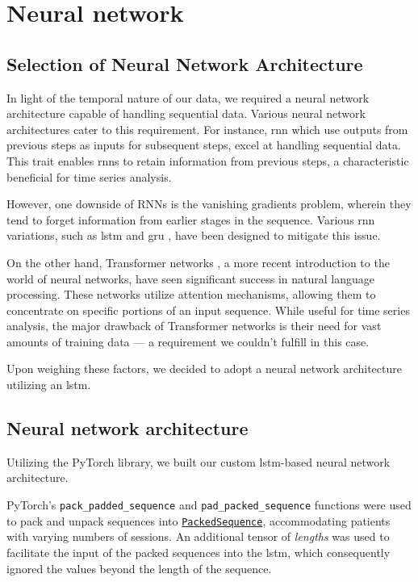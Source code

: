 \chapter{Neural network}\label{chap:nn}


\section{Selection of Neural Network Architecture}

In light of the temporal nature of our data, we required a neural network
architecture capable of handling sequential data. Various neural network
architectures cater to this requirement. For instance, \gls{rnn} which use
outputs from previous steps as inputs for subsequent steps, excel at handling
sequential data. This trait enables \gls{rnn}s to retain information from
previous steps, a characteristic beneficial for time series analysis.

However, one downside of RNNs is the vanishing gradients problem, wherein they
tend to forget information from earlier stages in the sequence. Various
\gls{rnn} variations, such as \gls{lstm} \cite{lstm:1997} and \gls{gru}
\cite{gru:2014}, have been designed to mitigate this issue.

On the other hand, Transformer networks \cite{attention2017}, a more recent
introduction to the world of neural networks, have seen significant success in
natural language processing. These networks utilize attention mechanisms,
allowing them to concentrate on specific portions of an input sequence. While
useful for time series analysis, the major drawback of Transformer networks is
their need for vast amounts of training data --- a
requirement we couldn't fulfill in this case.

Upon weighing these factors, we decided to adopt a neural network architecture
utilizing an \gls{lstm}.

\section{Neural network architecture}

Utilizing the PyTorch library, we built our custom \gls{lstm}-based neural
network architecture. 

PyTorch's \texttt{pack\_padded\_sequence} and \texttt{pad\_packed\_sequence}
functions were used to pack and unpack sequences into
\href{https://pytorch.org/docs/stable/generated/torch.nn.utils.rnn.PackedSequence.html}{\texttt{PackedSequence}},
accommodating patients with varying numbers of sessions. An additional tensor
of \textit{lengths} was used to facilitate the input of the packed sequences
into the \gls{lstm}, which consequently ignored the values beyond the length of
the sequence.

